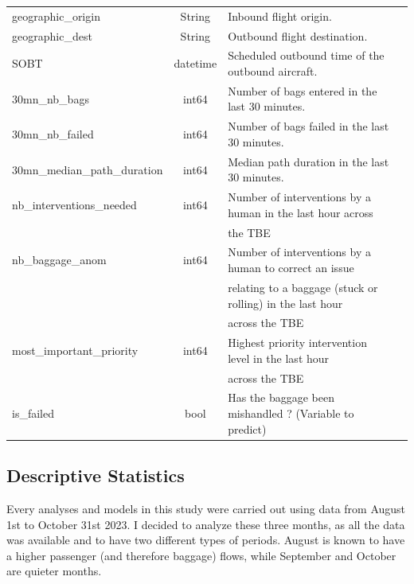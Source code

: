 \documentclass[12pt]{article}
\begin{document}
\begin{table}[ht]
\begin{tabularx}{\textwidth}{lclX}
        geographic\_origin & String & Inbound flight origin. \\
        geographic\_dest & String & Outbound flight destination. \\
        SOBT & datetime & Scheduled outbound time of the outbound aircraft. \\
        30mn\_nb\_bags & int64 & Number of bags entered in the last 30 minutes. \\
        30mn\_nb\_failed & int64 & Number of bags failed in the last 30 minutes. \\
        30mn\_median\_path\_duration & int64 & Median path duration in the last 30 minutes. \\
        nb\_interventions\_needed & int64 & Number of interventions by a human in the last hour across \\ && the TBE \\
        nb\_baggage\_anom & int64 & Number of interventions by a human to correct an issue \\ &&relating to a baggage (stuck or rolling) in the last hour \\ && across the TBE \\
        most\_important\_priority & int64 & Highest priority intervention level in the last hour \\ && across the TBE \\
        is\_failed & bool & Has the baggage been mishandled ? (Variable to predict) \\
        
        \bottomrule
    \end{tabularx}
\end{table}
\FloatBarrier

\newpage
\subsection{Descriptive Statistics}
Every analyses and models in this study were carried out using data from August 1st to October 31st 2023. I decided to analyze these three months, as all the data was available and to have two different types of periods. August is known to have a higher passenger (and therefore baggage) flows, while September and October are quieter months.
\end{document}
